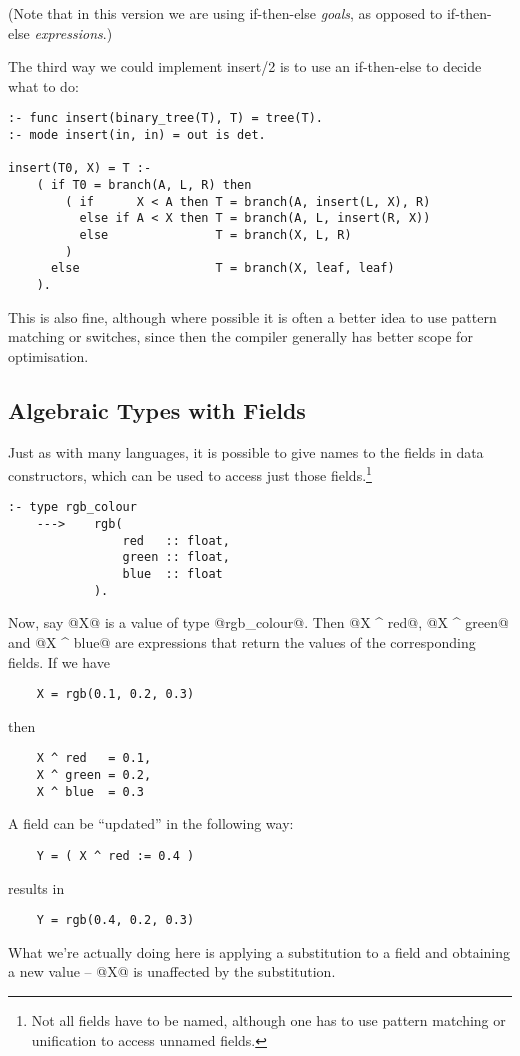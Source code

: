 \documentclass[a4paper,11pt,notitlepage,onecolumn]{article}
\begin{document}
(Note that in this version we are using if-then-else \emph{goals},
as opposed to if-then-else \emph{expressions}.)

The third way we could implement insert/2 is to use an
if-then-else to decide what to do:
\begin{verbatim}
:- func insert(binary_tree(T), T) = tree(T).
:- mode insert(in, in) = out is det.

insert(T0, X) = T :-
    ( if T0 = branch(A, L, R) then
        ( if      X < A then T = branch(A, insert(L, X), R)
          else if A < X then T = branch(A, L, insert(R, X))
          else               T = branch(X, L, R)
        )
      else                   T = branch(X, leaf, leaf)
    ).
\end{verbatim}
This is also fine, although where possible it is often a
better idea to use pattern matching or switches, since then
the compiler generally has better scope for optimisation.

\subsection{Algebraic Types with Fields}
Just as with many languages, it is possible to give names to
the fields in data constructors, which can be used to access
just those fields.\footnote{Not all fields have to be named, although one has
to use pattern matching or unification to access unnamed
fields.}
\begin{verbatim}
:- type rgb_colour
    --->    rgb(
                red   :: float,
                green :: float,
                blue  :: float
            ).
\end{verbatim}
Now, say @X@ is a value of type @rgb_colour@.  Then @X ^ red@,
@X ^ green@ and @X ^ blue@ are expressions that return the values
of the corresponding fields.  If we have
\begin{verbatim}
    X = rgb(0.1, 0.2, 0.3)
\end{verbatim}
then
\begin{verbatim}
    X ^ red   = 0.1,
    X ^ green = 0.2,
    X ^ blue  = 0.3
\end{verbatim}
A field can be ``updated'' in the following way:
\begin{verbatim}
    Y = ( X ^ red := 0.4 )
\end{verbatim}
results in
\begin{verbatim}
    Y = rgb(0.4, 0.2, 0.3)
\end{verbatim}
What we're actually doing here is applying a substitution to
a field and obtaining a new value -- @X@ is unaffected by the
substitution.
\end{document}
